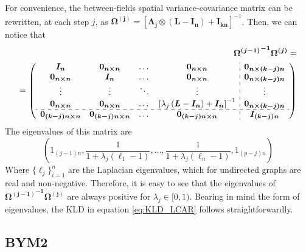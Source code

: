 \documentclass[openany, 11pt, oneside]{book}
\begin{document}
\begin{subappendices}
For convenience, the between-fields spatial variance-covariance matrix can be rewritten, at each step $j$, as $\boldsymbol{\Omega^{(j)}} = \left[ \boldsymbol{\Lambda_j} \otimes\left( \boldsymbol{L} - \boldsymbol{I_n} \right)+\boldsymbol{I_{kn}} \right]^{-1}$. Then, we can notice that
\begin{align*}
\boldsymbol{{\Omega^{(j-1)}}^{-1}}\boldsymbol{\Omega^{(j)}} = \\ =
\left( \begin{array}{cccc:c}
\boldsymbol{I_n} & \boldsymbol{0_{n \times n}} & \dots & \boldsymbol{0_{n \times n}} & \boldsymbol{0_{n\times(k-j)n}} \\
\boldsymbol{0_{n \times n}}& \boldsymbol{I_n} & \dots & \boldsymbol{0_{n \times n}} & \boldsymbol{0_{n\times(k-j)n}} \\
\vdots & \vdots & \ddots & \vdots & \vdots\\
\boldsymbol{0_{n \times n}} & \boldsymbol{0_{n \times n}} & \dots & \left[\lambda_j\left( \boldsymbol{L}-\boldsymbol{I_n} \right) + \boldsymbol{I_n}\right]^{-1} & \boldsymbol{0_{n\times(k-j)n}} \\
\hdashline
\boldsymbol{0_{(k-j)n\times n}} & \boldsymbol{0_{(k-j)n\times n}} & \dots & \boldsymbol{0_{(k-j)n\times n}} & \boldsymbol{I_{(k-j)n}}
\end{array} \right)
\end{align*}
The eigenvalues of this matrix are
$$
\left(
1_{(j-1)n}, \frac{1}{1+\lambda_j (\ell_1-1)}, \dots , \frac{1}{1+\lambda_j (\ell_n-1)}, 1_{(p-j)n}
\right)
$$
Where $\lbrace \ell_j \rbrace_{i=1}^n$ are the Laplacian eigenvalues, which for undirected graphs are real and non-negative. Therefore, it is easy to see that the eigenvalues of $\boldsymbol{{\Omega^{(j-1)}}^{-1}}\boldsymbol{\Omega^{(j)}}$ are always positive for $\lambda_j \in [0, 1)$. Bearing in mind the form of eigenvalues, the KLD in equation \ref{eq:KLD_LCAR} follows straightforwardly.
  



\subsection{BYM2}


\end{subappendices}
\end{document}
